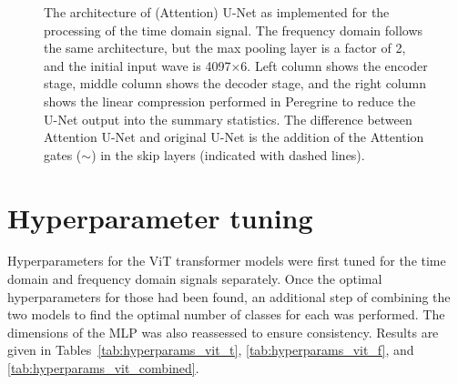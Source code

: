 \begin{appendices}
\begin{figure}[htb]
 
\caption{The architecture of (Attention) U-Net as implemented for the processing of the time domain signal. The frequency domain follows the same architecture, but the max pooling layer is a factor of 2, and the initial input wave is 4097$\times$6. Left column shows the encoder stage, middle column shows the decoder stage, and the right column shows the linear compression performed in Peregrine to reduce the U-Net output into the summary statistics. The difference between Attention U-Net and original U-Net is the addition of the Attention gates ($\sim$) in the skip layers (indicated with dashed lines).}
\label{fig:Attention_UNet_arch}
 \end{figure}

\section{Hyperparameter tuning}
\label{sec:apx:Hyperparameter_tuning}

Hyperparameters for the ViT transformer models were first tuned for the time domain and frequency domain signals separately. Once the optimal hyperparameters for those had been found, an additional step of combining the two models to find the optimal number of classes for each was performed. The dimensions of the MLP was also reassessed to ensure consistency. Results are given in Tables~\ref{tab:hyperparams_vit_t}, \ref{tab:hyperparams_vit_f}, and \ref{tab:hyperparams_vit_combined}.


\end{appendices}

